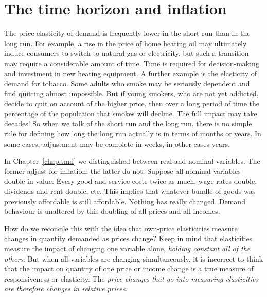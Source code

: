 \section{The time horizon and inflation} \label{sec:inflation}

The price elasticity of demand is frequently lower in the short run than in the long run. For example, a rise in the price of home heating oil may ultimately induce consumers to switch to natural gas or electricity, but such a transition may require a considerable amount of time. Time is required for decision-making and investment in new heating equipment. A further example is the elasticity of demand for tobacco. Some adults who smoke may be seriously dependent and find quitting almost impossible. But if young smokers, who are not yet addicted, decide to quit on account of the higher price, then over a long period of time the percentage of the population that smokes will decline. The full impact may take decades! So when we talk of the short run and the long run, there is no simple rule for defining how long the long run actually is in terms of months or years. In some cases, adjustment may be complete in weeks, in other cases years.

In Chapter~\ref{chap:tmd} we distinguished between real and nominal variables. The former adjust for inflation; the latter do not. Suppose all nominal variables double in value: Every good and service costs twice as much, wage rates double, dividends and rent double, etc. This implies that whatever bundle of goods was previously affordable is still affordable. Nothing has really changed. Demand behaviour is unaltered by this doubling of all prices and all incomes. 

How do we reconcile this with the idea that own-price elasticities measure changes in quantity demanded as prices change? Keep in mind that elasticities measure the impact of changing one variable alone, \textit{holding constant all of the others}. But when all variables are changing simultaneously, it is incorrect to think that the impact on quantity of one price or income change is a true measure of responsiveness or elasticity. The \textit{price changes that go into measuring elasticities are therefore changes in relative prices}.